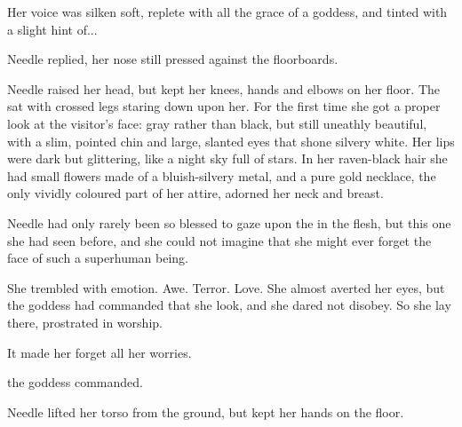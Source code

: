Her voice was silken soft, replete with all the grace of a goddess, and tinted with a slight hint of... 

 Needle replied, her nose still pressed against the floorboards. 


Needle raised her head, but kept her knees, hands and elbows on her floor. 
The \resvil{} sat with crossed legs staring down upon her. 
For the first time she got a proper look at the visitor's face: 
gray rather than black, but still uneathly beautiful, with a slim, pointed chin and large, slanted eyes that shone silvery white. 
Her lips were dark but glittering, like a night sky full of stars. 
In her raven-black hair she had small flowers made of a bluish-silvery metal, and a pure gold necklace, the only vividly coloured part of her attire, adorned her neck and breast. 


Needle had only rarely been so blessed to gaze upon the \resphain{} in the flesh, but this one she had seen before, and she could not imagine that she might ever forget the face of such a superhuman being. 


She trembled with emotion. 
Awe. 
Terror. 
Love. 
She almost averted her eyes, but the goddess had commanded that she look, and she dared not disobey.  
So she lay there, prostrated in worship. 

It made her forget all her worries. 



\begin{comment}
\section{\Achsah{} gives orders} 
\end{comment}

 the goddess commanded. 

Needle lifted her torso from the ground, but kept her hands on the floor.  


